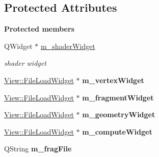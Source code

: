 \subsection*{Protected Attributes}
\begin{Indent}\textbf{ Protected members}\par
\begin{DoxyCompactItemize}
\item 
\mbox{\label{classrev_1_1_add_shader_command_acf56e6ca4237284ca9c090cee7d56d86}} 
Q\+Widget $\ast$ \mbox{\hyperlink{classrev_1_1_add_shader_command_acf56e6ca4237284ca9c090cee7d56d86}{m\+\_\+shader\+Widget}}
\begin{DoxyCompactList}\small\item\em shader widget \end{DoxyCompactList}\item 
\mbox{\label{classrev_1_1_add_shader_command_a11eb6db98c255349d03b0d332f98a1ab}} 
\mbox{\hyperlink{classrev_1_1_view_1_1_file_load_widget}{View\+::\+File\+Load\+Widget}} $\ast$ {\bfseries m\+\_\+vertex\+Widget}
\item 
\mbox{\label{classrev_1_1_add_shader_command_ac5ccd5cf6bc4f9d2c9eba84f97fd24de}} 
\mbox{\hyperlink{classrev_1_1_view_1_1_file_load_widget}{View\+::\+File\+Load\+Widget}} $\ast$ {\bfseries m\+\_\+fragment\+Widget}
\item 
\mbox{\label{classrev_1_1_add_shader_command_afe0db0e70638064265f89866166f7a31}} 
\mbox{\hyperlink{classrev_1_1_view_1_1_file_load_widget}{View\+::\+File\+Load\+Widget}} $\ast$ {\bfseries m\+\_\+geometry\+Widget}
\item 
\mbox{\label{classrev_1_1_add_shader_command_a619a35169853e4850c47a414687d94f8}} 
\mbox{\hyperlink{classrev_1_1_view_1_1_file_load_widget}{View\+::\+File\+Load\+Widget}} $\ast$ {\bfseries m\+\_\+compute\+Widget}
\item 
\mbox{\label{classrev_1_1_add_shader_command_aa9fce2066628c4e4944f1541f142b458}} 
Q\+String {\bfseries m\+\_\+frag\+File}
\item 
\mbox{\label{classrev_1_1_add_shader_command_a5e48e0b750346ae692beca75b161283a}} 

\end{DoxyCompactItemize}
\end{Indent}
